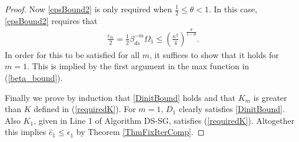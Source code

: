 \begin{proof}
          
          
           Now \eqref{epsBound2} is only required when $\frac{1}{2}\leq\theta<1$. In this case, \eqref{epsBound2} requires that
   \begin{eqnarray*}
   \frac{\epsilon_m}{2} = \frac{1}{2}\beta_{ds}^{-m}\Omega_1
      \leq
      \left(\frac{\kappa^2}{4}\right)^{\frac{\theta}{1-\theta}}.
   \end{eqnarray*}
   In order for this to be satisfied for all $m$, it suffices to show that it holds for $m=1$. This is implied by the first argument in the max function in (\ref{beta_bound}). 
   
   
   

    
    Finally we prove by induction that \eqref{DinitBound} holds and that $K_m$ is greater than $K$ defined in (\ref{requiredK}). For $m=1$, $D_1$ clearly satisfies \eqref{DinitBound}.   Also $K_1$, given in Line 1 of Algorithm DS-SG, satisfies (\ref{requiredK}).  Altogether this implies $\hat{e}_1\leq\epsilon_1$ by Theorem \ref{ThmFixIterComp}. 
    
   
   

\end{proof}
